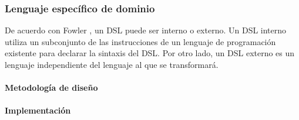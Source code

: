 \subsubsection{Lenguaje específico de dominio}
De acuerdo con Fowler \cite{fowler_domain-specific_2010}, un DSL puede ser interno o externo. Un DSL interno utiliza un subconjunto de las instrucciones de un lenguaje de programación existente para declarar la sintaxis del DSL. Por otro lado, un DSL externo es un lenguaje independiente del lenguaje al que se transformará.

\paragraph*{Metodología de diseño}


\paragraph*{Implementación}